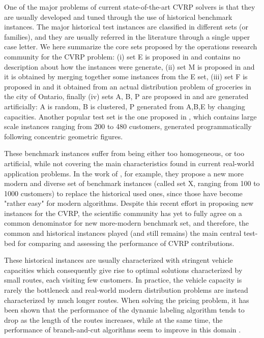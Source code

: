 One of the major problems of current state-of-the-art CVRP solvers
is that they are usually developed and tuned through the use of historical
benchmark instances.
The major historical test instances are classified in different sets (or families), and
they are usually referred in the literature through a single upper case letter.
We here summarize the core sets proposed by the operations research community for the CVRP problem:
(i) set E is proposed in \textcite{christofides1969} and contains no description about how the instances were generate,
(ii) set M is proposed in \textcite{christofides1979} and it is obtained by merging together some instances from the E set,
(iii) set F is proposed in \textcite{fisher1994} and it obtained from an actual distribution problem of groceries in the city of Ontario,
finally (iv) sets A, B, P are proposed in \textcite{augerat1995} and are generated artificially: A is random, B is clustered, P generated from A,B,E by changing capacities.
Another popular test set is the one proposed in \textcite{golden1998},
which contains large scale instances ranging from 200 to 480 customers,
generated programmatically following concentric geometric figures.

These benchmark instances suffer from being either too homogeneous, or too artificial,
while not covering the main characteristics found in current real-world application problems.
In the work of \textcite{uchoa2017}, for example, they propose
a new more modern and diverse set of benchmark instances (called set X, ranging from 100 to 1000 customers)
to replace the historical used ones, since those have become "rather easy" for modern algorithms.
Despite this recent effort in proposing new instances for the CVRP, the scientific community
has yet to fully agree on a common denominator for new more-modern benchmark set, and therefore,
the common and historical instances played (and still remains) the main central test-bed for comparing
and assessing the performance of CVRP contributions.

These historical instances are usually characterized with stringent vehicle capacities
which consequently give rise to optimal solutions characterized by small routes, each visiting few customers.
In practice, the vehicle capacity is rarely the bottleneck and
real-world modern distribution problems are instead characterized by much longer routes.
When solving the pricing problem, it has been shown that the performance of the dynamic labeling algorithm
tends to drop as the length of the routes increases,
while at the same time,
the performance of branch-and-cut algorithms seem to improve in this domain .

